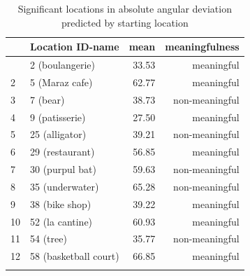 \begin{table}[h]
	\begin{center}
		\caption[Significant locations in absolute angular deviation predicted by starting location]{Significant locations in absolute angular deviation predicted by starting location} \vspace{10pt}
		\begin{tabular}{l l r r} 
			\hiderowcolors
			\hline \hline 
			{} & \setrow{\bfseries} Location ID-name & \setrow{\bfseries} mean & \setrow{\bfseries} meaningfulness \\ [.7ex] 
			\hline\hline
			\showrowcolors
			1 & 2 (boulangerie)		& 		33.53 		& meaningful	  \\ 
			\hline
			2 & 5 (Maraz cafe)		& 		62.77	 	& meaningful 	  \\
			\hline
			3 & 7 (bear) 			& 		38.73		& non-meaningful  \\
			\hline
			4 & 9 (patisserie) 		& 		27.50 		& meaningful	  \\
			\hline
			5 & 25 (alligator) 		& 		39.21 		& non-meaningful  \\ 
			\hline
			6 & 29 (restaurant)		& 		56.85 		& meaningful  \\ 
			\hline
			7 & 30 (purpul bat)		& 		59.63 		& non-meaningful  \\ 
			\hline
			8 & 35 (underwater)		& 		65.28 		& non-meaningful  \\
			\hline
			9 & 38 (bike shop)		& 		39.22 		& meaningful  \\
			\hline
			10 & 52 (la cantine)		& 		60.93 		& meaningful  \\
			\hline
			11 & 54 (tree)			& 		35.77 		& non-meaningful  \\
			\hline
			12 & 58 (basketball court)		& 		66.85 		& meaningful  \\ 		[1ex]
			\hiderowcolors \hline \hline
		\end{tabular}
		\label{tab:sig_angle_loc}
	\end{center}
\end{table}


